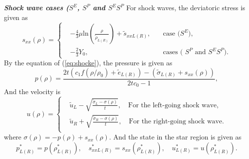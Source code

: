 \documentclass{article}
\numberwithin{equation}{section}
\numberwithin{table}{section}
\begin{document}
\emph{\textbf{Shock wave cases ($S^E$, $S^P$ and $S^ES^P$}}
For shock waves, the  deviatoric stress is given as
\begin{equation}
s_{xx}(\rho) = \left\{\begin{aligned}
	  & -\frac{4}{3}\mu\text{ln}\left(\frac{\rho}{\tilde{\rho}_{L(R)}}\right)+\tilde{s}_{xxL(R)},
	\quad  &\text{case ($S^E$)},\\
	& -\frac{2}{3}Y_0,   \quad
	&\text{cases ( $S^P$ and $S^ES^P$)}.
  \end{aligned} \right.
  \end{equation}
By the equation of (\ref{eq:shocke}), the pressure is given as
\begin{equation}
  p(\rho)=
  \frac{2t(c_1f(\rho/\rho_0)+\tilde{e}_{L(R)})-(\tilde{\sigma}_{L(R)}+{s}_{xx}(\rho))}{2tc_0-1},
\end{equation}
And the velocity is
\begin{equation}
  u(\rho)= \left\{ \begin{aligned}
	&	\tilde{u}_L -\sqrt{\frac{\tilde{\sigma}_L-\sigma(\rho)}{t}}, \quad \text{For the left-going shock wave},\\
	&  \tilde{u}_R +\sqrt{\frac{\tilde{\sigma}_R-\sigma(\rho)}{t}}, \quad \text{For the right-going shock wave}.\\
  \end{aligned}
\right.
\end{equation}
where $\sigma(\rho) = -p(\rho)+s_{xx}(\rho)$. And the state in  the star region is given as
\begin{equation}
  p^*_{L(R)} = p(\rho_{L(R)}^*),\quad s_{xxL(R)}^* = s_{xx}(\rho_{L(R)}^*),\quad  u^*_{L(R)} = u(\rho_{L(R)}^*).
\end{equation}
\end{document}
